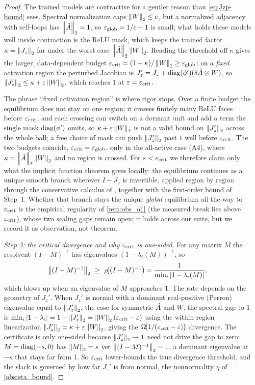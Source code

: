 \begin{proof}
The trained models are contractive for a gentler reason than \eqref{eq:Jzp-bound} sees. Spectral
normalization caps $\left\|W\right\|_2\le c$, but a normalized adjacency with self-loops has $\left\|\hat{A}\right\|_2=1$, so
$\varepsilon_{\mathrm{glob}}=1/c-1$ is small; what holds these models well inside contraction is the ReLU mask, which keeps the
trained factor $\kappa=\left\|J_z\right\|_2$ far under the worst case $\left\|\hat{A}\right\|_2\left\|W\right\|_2$. Reading the
threshold off $\kappa$ gives the larger, data-dependent budget $\varepsilon_{\mathrm{crit}}=(1-\kappa)/\left\|W\right\|_2\ge\varepsilon_{\mathrm{glob}}$:
on a \emph{fixed} activation region the perturbed Jacobian is
$J_z'=J_z+\operatorname{diag}(\phi')(\delta\hat{A}\otimes W)$, so $\left\|J_z'\right\|_2\le\kappa+\varepsilon\left\|W\right\|_2$, which
reaches $1$ at $\varepsilon=\varepsilon_{\mathrm{crit}}$.

The phrase ``fixed activation region'' is where rigor stops. Over a finite budget the equilibrium does not
stay on one region; it crosses finitely many ReLU faces before $\varepsilon_{\mathrm{crit}}$, and each crossing can switch on a
dormant unit and add a term the single mask $\operatorname{diag}(\phi')$ omits, so $\kappa+\varepsilon\left\|W\right\|_2$ is not a
valid bound on $\left\|J_z'\right\|_2$ across the whole ball; a free choice of mask can push $\left\|J_z'\right\|_2$ past
$1$ well before $\varepsilon_{\mathrm{crit}}$. The two budgets coincide, $\varepsilon_{\mathrm{crit}}=\varepsilon_{\mathrm{glob}}$, only in the all-active case (A4), where
$\kappa=\left\|\hat{A}\right\|_2\left\|W\right\|_2$ and no region is crossed. For $\varepsilon<\varepsilon_{\mathrm{crit}}$ we therefore claim only
what the implicit function theorem gives locally: the equilibrium continues as a unique smooth branch
wherever $I-J_z$ is invertible, applied region by region through the conservative calculus of
\citet{bolte2021conservative}, together with the first-order bound of Step~1. Whether that branch stays the
unique \emph{global} equilibrium all the way to $\varepsilon_{\mathrm{crit}}$ is the empirical regularity of \cref{rem:obs_o1}
(the measured break lies above $\varepsilon_{\mathrm{crit}}$), whose two scaling gaps remain open; it holds across our suite,
but we record it as observation, not theorem.

\emph{Step 3: the critical divergence and why $\varepsilon_{\mathrm{crit}}$ is one-sided.}
For any matrix $M$ the resolvent $(I-M)^{-1}$ has eigenvalues $(1-\lambda_i(M))^{-1}$, so
\begin{equation}
\norm{(I-M)^{-1}}_2\ \ge\ \rho\!\big((I-M)^{-1}\big)=\frac{1}{\min_i\abs{1-\lambda_i(M)}},
\label{eq:resolvent-lb}
\end{equation}
which blows up when an eigenvalue of $M$ approaches $1$. The rate depends on the geometry of $J_z'$.
When $J_z'$ is normal with a dominant real-positive (Perron) eigenvalue equal to $\left\|J_z'\right\|_2$, the
case for symmetric $\hat{A}$ and $W$, the spectral gap to $1$ is
$\min_i\left|1-\lambda_i\right|=1-\left\|J_z'\right\|_2=\left\|W\right\|_2(\varepsilon_{\mathrm{crit}}-\varepsilon)$ using the within-region
linearization $\left\|J_z'\right\|_2=\kappa+\varepsilon\left\|W\right\|_2$, giving the $\Omega\!\big(1/(\varepsilon_{\mathrm{crit}}-\varepsilon)\big)$ divergence. The certificate is only
one-sided because $\left\|J_z'\right\|_2\to1$ need not drive the gap to zero: $M=\operatorname{diag}(-s,0)$ has
$\left\|M\right\|_2=s$ yet $\left\|(I-M)^{-1}\right\|_2=1$, a dominant eigenvalue at $-s$ that stays far from $1$. So
$\varepsilon_{\mathrm{crit}}$ lower-bounds the true divergence threshold, and the slack is governed by how far $J_z'$ is from
normal, the nonnormality $\eta$ of \cref{obs:eta_bound}.


\end{proof}
